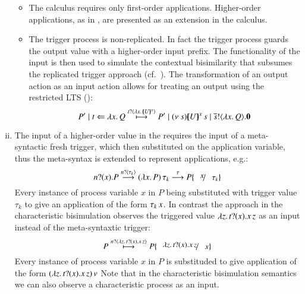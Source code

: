 \begin{enumerate}[i)]
\begin{itemize}
			\item	The \HOp calculus requires only first-order
				applications. Higher-order applications,
				as in \cite{JeffreyR05},
				are presented as an extension in the \HOpp
				calculus.

			\item	The trigger process is non-replicated. In fact
				the trigger process guards the output
				value with a higher-order input prefix. The
				functionality of the input is then used to
				simulate the contextual bisimilarity that subsumes
				the replicated trigger approach (cf.~).
				The transformation of an output action as an input
				action allows for treating an output
				using the restricted LTS ():
				\[
					P' \Par \htrigger{t}{\abs{x}{Q}} \hby{\bactinp{t}{\abs{x}{\mapchar{U}{x}}}}
					P' \Par \news{s}{ \appl{\mapchar{U}{x}}{s} \Par \bout{\dual{s}}{\abs{x}{Q}} \inact}
				\]
		\end{itemize}

	\item	The input of a higher-order value in the \cite{JeffreyR05}
		requires 
		the input of a meta-syntactic fresh trigger, which then
		substituted on the application variable, thus the meta-syntax
		is extended to represent applications, e.g.:
		\[
			\binp{n}{x} P \by{\bactinp{n}{\tau_k}} \appl{(\abs{x}{P})}{\tau_k} \by{\tau} P \subst{x}{\tau_k} 
		\]
		Every instance of process variable $x$ in $P$ being substituted
		with trigger value $\tau_k$ to give an application of the form $\tau_k\,x$.
		In contrast the approach in the characteristic bisimulation observes the
		triggered value
		$\lambda z.\,t ? (x) . x\,z$ as an input instead of the
		meta-syntaxtic trigger:
		\[
			P \hby{\bactinp{n}{\abs{z}\binp{t}{x} \appl{x}{z}}} P \subst{\abs{z}\binp{t}{x} \appl{x}{z}}{x}
		\]
		Every instance of process variable $x$ in $P$
		is substituded to give application of the form
		$(\lambda z.\,t ? (x) . x\,z)\,v$
		Note that in the characteristic bisimulation semantics
		we can also observe a characteristic process as an input.
		

\end{enumerate}
